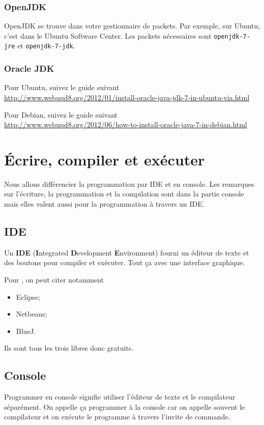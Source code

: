 \subsubsection{OpenJDK}
OpenJDK se trouve dans votre gestionnaire de packets.
Par exemple, sur Ubuntu, c'est dans le Ubuntu Software Center.
Les packets nécessaires sont \lstinline|openjdk-7-jre| et
\lstinline|openjdk-7-jdk|.

\subsubsection{Oracle JDK}
Pour Ubuntu, suivez le guide suivant\\
\url{http://www.webupd8.org/2012/01/install-oracle-java-jdk-7-in-ubuntu-via.html}

Pour Debian, suivez le guide suivant\\
\url{http://www.webupd8.org/2012/06/how-to-install-oracle-java-7-in-debian.html}


\section{Écrire, compiler et exécuter}
Nous allons différencier la programmation par IDE et en console.
Les remarques sur l'écriture, la programmation et la compilation
sont dans la partie console mais elles valent aussi pour la
programmation à travers un IDE.

\subsection{IDE}
Un \textbf{IDE} (\textbf{I}ntegrated \textbf{D}evelopment \textbf{E}nvironment)
fourni un éditeur de texte et des boutons pour compiler et exécuter.
Tout ça avec une interface graphique.

Pour \java{}, on peut citer notamment
\begin{itemize}
  \item Eclipse;
  \item Netbeans;
  \item BlueJ.
\end{itemize}
Ils sont tous les trois libres donc gratuits.

\subsection{Console}
Programmer en console signifie utiliser
l'éditeur de texte et le compilateur séparément.
On appelle ça programmer à la console car on appelle souvent le compilateur
et on exécute le programme à travers l'invite de commande.

